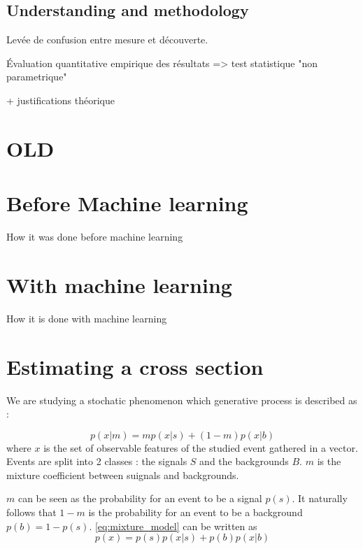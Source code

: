 \subsection{Understanding and methodology} %
\label{sub:understanding_and_methodology}

Levée de confusion entre mesure et découverte.

Évaluation quantitative empirique des résultats => test statistique "non parametrique"

+ justifications théorique


\section{OLD} %



\section{Before Machine learning}

How it was done before machine learning

\section{With machine learning}

How it is done with machine learning


\section{Estimating a cross section} %
\label{sec:estimating_a_cross_section}

We are studying a stochatic phenomenon which generative process is described as :

\begin{equation}
	\label{eq:mixture_model}
	p(x|m) = m p(x|s) + (1-m) p(x|b)
\end{equation}
where $x$ is the set of observable features of the studied event gathered in a vector.
Events are split into 2 classes : the signals $S$ and the backgrounds $B$.
$m$ is the mixture coefficient between suignals and backgrounds.

$m$ can be seen as the probability for an event to be a signal $p(s)$. 
It naturally follows that $1-m$ is the probability for an event to be a background $p(b)=1-p(s)$.
\autoref{eq:mixture_model} can be written as
\begin{equation}
	p(x) = p(s)p(x|s) + p(b)p(x|b)
\end{equation}

